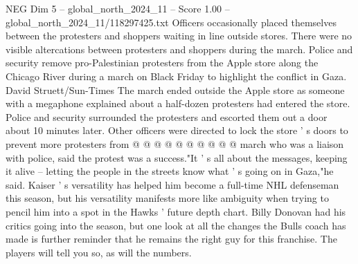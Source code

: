 \begin{textsample}{NEG Dim 5 – global\_north\_2024\_11 – Score 1.00 – global\_north\_2024\_11/118297425.txt}
Officers occasionally placed themselves between the protesters and shoppers waiting in line outside stores.
There were no visible altercations between protesters and shoppers during the march.
Police and security remove pro-Palestinian protesters from the Apple store along the Chicago River during a march on Black Friday to highlight the conflict in Gaza.
David Struett/Sun-Times The march ended outside the Apple store as someone with a megaphone explained about a half-dozen protesters had entered the store.
Police and security surrounded the protesters and escorted them out a door about 10 minutes later.
Other officers were directed to lock the store ' s doors to prevent more protesters from @ @ @ @ @ @ @ @ @ @ march who was a liaison with police, said the protest was a success."It ' s all about the messages, keeping it alive -- letting the people in the streets know what ' s going on in Gaza,"he said.
Kaiser ' s versatility has helped him become a full-time NHL defenseman this season, but his versatility manifests more like ambiguity when trying to pencil him into a spot in the Hawks ' future depth chart.
Billy Donovan had his critics going into the season, but one look at all the changes the Bulls coach has made is further reminder that he remains the right guy for this franchise.
The players will tell you so, as will the numbers.

\end{textsample}
